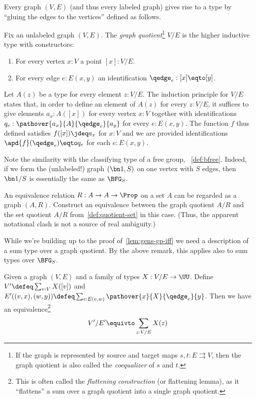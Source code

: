 Every graph $(V,E)$ (and thus every labeled graph) gives rise to a type
by ``gluing the edges to the vertices'' defined as follows.
\begin{definition}
  Fix an unlabeled graph $(V,E)$. The \emph{graph quotient}\footnote{%
    If the graph is represented by source and target maps
    $s,t: E \rightrightarrows V$, then the graph quotient is
  also called the \emph{coequalizer} of $s$ and $t$.} $V/E$ is
  the higher inductive type with constructors:
  \begin{enumerate}
  \item For every vertex $x : V$ a point $[x] : V/E$.
  \item For every edge $e : E(x,y)$ an identification $\qedge_e : [x] \eqto [y]$.
  \end{enumerate}

  Let $A(z)$ be a type for every element $z:V/E$. The induction principle
  for $V/E$ states that, in order to define an element of $A(z)$ for every $z:V/E$,
  it suffices to give elements $a_x : A([x])$ for every vertex $x:V$
  together with
  identifications $q_e : \pathover{a_x}{A}{\qedge_e}{a_y}$
  for every $e:E(x,y)$.
  The function $f$ thus defined satisfies $f([x])\jdeq a_x$ for $x:V$
  and we are provided identifications $\apd{f}(\qedge_e)\eqto q_e$ for each $e:E(x,y)$.
\end{definition}
\begin{remark}
  Note the similarity with the classifying type of a free group,
  \cf~\cref{def:bfree}. Indeed, if we form the (unlabeled!)
  graph $(\bn 1,S)$
  on one vertex with $S$ edges, then $\bn 1/S$ is essentially the same as $\BFG_S$.
\end{remark}
\begin{xca}
  An equivalence relation $R : A \to A \to \Prop$ on a set $A$
  can be regarded as a graph $(A,R)$.
  Construct an equivalence between the graph quotient $A/R$
  and the set quotient $A/R$ from~\cref{def:quotient-set} in this case.
  (Thus, the apparent notational clash is not a source of real ambiguity.)
\end{xca}
While we're building up to the proof of~\cref{lem:gens-gp-iff} we need
a description of a sum type over a graph quotient.
By the above remark, this applies also to sum types over $\BFG_S$.
\begin{construction}\label{def:graph-quotient-flattening}
  Given a graph $(V,E)$ and a family of types $X : V/E \to \UU$.
  Define $V' \defeq \sum_{v:V}X([v])$ and
  $E'((v,x),(w,y)) \defeq \sum_{e:E(v,w)}\pathover{x}{X}{\qedge_e}{y}$.
  Then we have an equivalence\footnote{%
    This is often called the \emph{flattening construction} (or flattening lemma),
    as it ``flattens'' a sum over a graph quotient into a single graph quotient.}
  \[
    V'/E' \equivto \sum_{z:V/E}X(z)
  \]
\end{construction}
